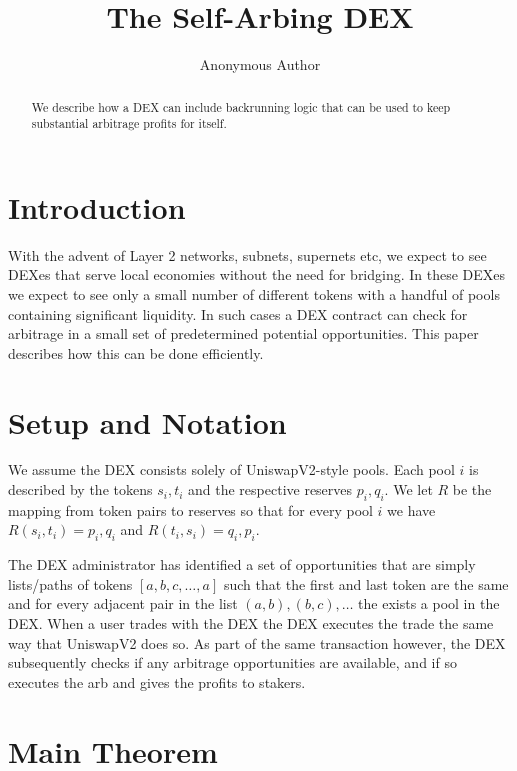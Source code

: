 \documentclass{article}
\makeatletter
\renewcommand\tableofcontents{%
    \@starttoc{toc}%
}
\makeatother
\begin{document}
\title{The Self-Arbing DEX}

\author{Anonymous Author}

\maketitle

\begin{abstract}
We describe how a DEX can include backrunning logic 
that can be used to keep substantial arbitrage profits 
for itself.
\end{abstract}

\tableofcontents
\section{Introduction}
With the advent of Layer 2 networks, subnets, supernets etc, 
we expect to see DEXes
that serve local economies without the need for bridging.
In these DEXes we expect to see only a small number of different tokens
with a handful of pools containing significant liquidity.
In such cases a DEX contract can check for arbitrage 
in a small set of predetermined potential opportunities.
This paper describes how this can be done efficiently.

\section{Setup and Notation}
We assume the DEX consists solely of UniswapV2-style pools.
Each pool $i$ is described by the tokens $s_i,t_i$ and 
the respective reserves $p_i, q_i$.
We let $R$ be the mapping from token pairs to reserves so
that for every pool $i$ we have $R(s_i, t_i) = p_i, q_i$
and $R(t_i, s_i) = q_i, p_i$.

The DEX administrator has identified a set of opportunities
that are simply lists/paths of tokens $[a,b,c, \ldots,a]$ such that
the first and last token are the same and for every adjacent
pair in the list $(a,b), (b,c), \ldots$ the exists a pool
in the DEX. When a user trades with the DEX the DEX executes 
the trade the same way that UniswapV2 does so. As part of the
same transaction however, the DEX subsequently checks if any
arbitrage opportunities are available, and if so executes 
the arb and gives the profits to stakers.

\section{Main Theorem}
\end{document}
